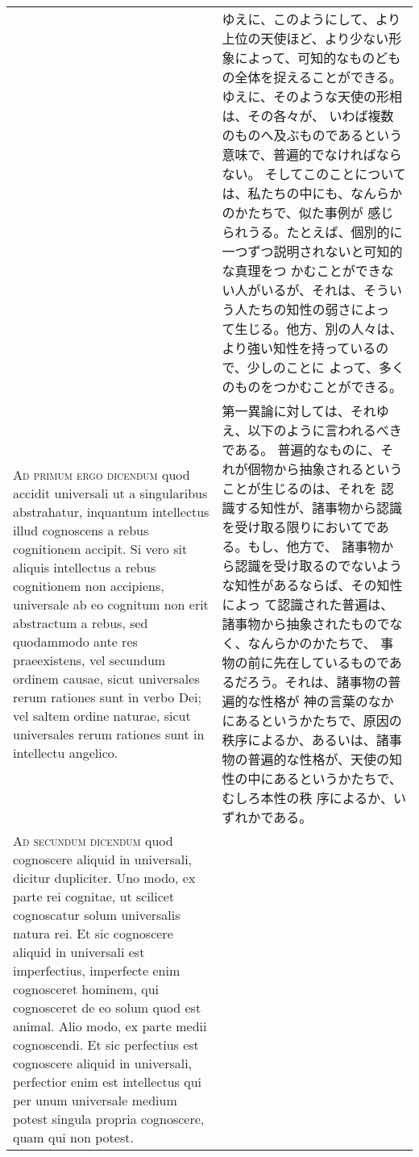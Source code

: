 \documentclass[10pt]{jsarticle} %
\begin{document}
\begin{longtable}{p{21em}p{21em}}
&

ゆえに、このようにして、より上位の天使ほど、より少ない形象によって、可知的なものども
 の全体を捉えることができる。ゆえに、そのような天使の形相は、その各々が、
 いわば複数のものへ及ぶものであるという意味で、普遍的でなければならない。
そしてこのことについては、私たちの中にも、なんらかのかたちで、似た事例が
 感じられうる。たとえば、個別的に一つずつ説明されないと可知的な真理をつ
 かむことができない人がいるが、それは、そういう人たちの知性の弱さによっ
 て生じる。他方、別の人々は、より強い知性を持っているので、少しのことに
 よって、多くのものをつかむことができる。


\\


{\scshape Ad primum ergo dicendum} quod accidit
universali ut a singularibus abstrahatur, inquantum intellectus illud
cognoscens a rebus cognitionem accipit. Si vero sit aliquis intellectus
a rebus cognitionem non accipiens, universale ab eo cognitum non erit
abstractum a rebus, sed quodammodo ante res praeexistens, vel secundum
ordinem causae, sicut universales rerum rationes sunt in verbo Dei; vel
saltem ordine naturae, sicut universales rerum rationes sunt in
intellectu angelico.

&

 第一異論に対しては、それゆえ、以下のように言われるべきである。
 普遍的なものに、それが個物から抽象されるということが生じるのは、それを
認識する知性が、諸事物から認識を受け取る限りにおいてである。もし、他方で、
 諸事物から認識を受け取るのでないような知性があるならば、その知性によっ
 て認識された普遍は、諸事物から抽象されたものでなく、なんらかのかたちで、
 事物の前に先在しているものであるだろう。それは、諸事物の普遍的な性格が
 神の言葉のなかにあるというかたちで、原因の秩序によるか、あるいは、諸事
 物の普遍的な性格が、天使の知性の中にあるというかたちで、むしろ本性の秩
 序によるか、いずれかである。

\\



{\scshape Ad secundum dicendum} quod cognoscere aliquid
in universali, dicitur dupliciter. Uno modo, ex parte rei cognitae, ut
scilicet cognoscatur solum universalis natura rei. Et sic cognoscere
aliquid in universali est imperfectius, imperfecte enim cognosceret
hominem, qui cognosceret de eo solum quod est animal. Alio modo, ex
parte medii cognoscendi. Et sic perfectius est cognoscere aliquid in
universali, perfectior enim est intellectus qui per unum universale
medium potest singula propria cognoscere, quam qui non potest.


\end{longtable}
\end{document}
